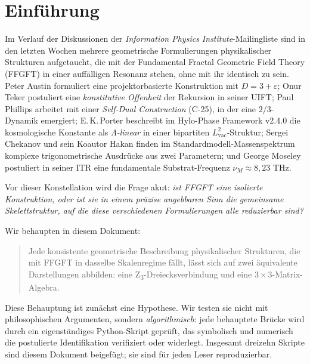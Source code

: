 
\section{Einführung}
\label{sec:einfuehrung}

Im Verlauf der Diskussionen der \emph{Information Physics Institute}-Mailingliste sind in den letzten Wochen mehrere geometrische Formulierungen physikalischer Strukturen aufgetaucht, die mit der Fundamental Fractal Geometric Field Theory (FFGFT) in einer auffälligen Resonanz stehen, ohne mit ihr identisch zu sein. Peter Austin formuliert eine projektorbasierte Konstruktion mit \(D = 3 + \varepsilon\); Onur Teker postuliert eine \emph{konstitutive Offenheit} der Rekursion in seiner UIFT; Paul Phillips arbeitet mit einer \emph{Self-Dual Construction} (C-25), in der eine \(2/3\)-Dynamik emergiert; E.\,K.\,Porter beschreibt im Hylo-Phase Framework v2.4.0 die kosmologische Konstante als \emph{\(\Lambda\)-linear} in einer bipartiten \(L_\text{vac}^2\)-Struktur; Sergei Chekanov und sein Koautor Hakan finden im Standardmodell-Massenspektrum komplexe trigonometrische Ausdrücke aus zwei Parametern; und George Moseley postuliert in seiner ITR eine fundamentale Substrat-Frequenz \(\nu_M \approx 8{,}23\) THz.

Vor dieser Konstellation wird die Frage akut: \emph{ist FFGFT eine isolierte Konstruktion, oder ist sie in einem präzise angebbaren Sinn die gemeinsame Skelettstruktur, auf die diese verschiedenen Formulierungen alle reduzierbar sind?}

Wir behaupten in diesem Dokument:
\begin{quote}
Jede konsistente geometrische Beschreibung physikalischer Strukturen, die mit FFGFT in dasselbe Skalenregime fällt, lässt sich auf zwei äquivalente Darstellungen abbilden: eine Z\textsubscript{3}-Dreiecksverbindung und eine 3\,$\times$\,3-Matrix-Algebra.
\end{quote}

Diese Behauptung ist zunächst eine Hypothese. Wir testen sie nicht mit philosophischen Argumenten, sondern \emph{algorithmisch}: jede behauptete Brücke wird durch ein eigenständiges Python-Skript geprüft, das symbolisch und numerisch die postulierte Identifikation verifiziert oder widerlegt. Insgesamt dreizehn Skripte sind diesem Dokument beigefügt; sie sind für jeden Leser reproduzierbar.

